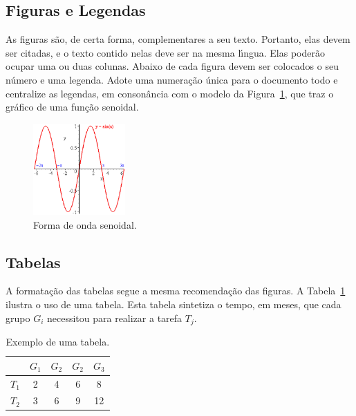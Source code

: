 \documentclass[11pt]{article}
\begin{document}
\subsection{Figuras e Legendas}
\label{sec:figuras}

As figuras s\~{a}o, de certa forma, complementares a seu texto.  Portanto,
elas devem ser citadas, e o texto contido nelas deve ser na mesma
l\'{\i}ngua. Elas poder\~{a}o ocupar uma ou duas colunas.  Abaixo de cada
figura devem ser colocados o seu n\'{u}mero e uma legenda.  Adote uma
numera\c{c}\~{a}o \'{u}nica para o documento todo e centralize as legendas, em
conson\^{a}ncia com o modelo da Figura~\ref{fig:forma_de_onda}, que traz o
gr\'{a}fico de uma fun\c{c}\~{a}o senoidal.

  \begin{figure}[H]
        {\centering
        \includegraphics[height=35mm]{sin.ps}
        \caption{Forma de onda senoidal.}
        \label{fig:forma_de_onda}\par}
  \end{figure}

\subsection{Tabelas}
\label{ssec:tabelas}

A formata\c{c}\~{a}o das tabelas segue a mesma recomenda\c{c}\~{a}o das figuras.
A Tabela~\ref{tab:ex} ilustra o uso de uma tabela. Esta tabela sintetiza
o tempo, em meses, que cada grupo $G_i$ necessitou para realizar a
tarefa $T_j$.

\begin{table}[H]
  {\centering
  \begin{tabular}{|c|c|c|c|c|}
  \hline
   & $G_1$ & $G_2$ & $G_2$ & $G_3$ \\
  \hline
  $T_1$ & 2 & 4 & 6 & 8 \\
  \hline
  $T_2$ & 3 & 6 & 9 & 12 \\
  \hline
  \end{tabular}
\caption{Exemplo de uma tabela.}
\label{tab:ex}
\par}
\end{table}
\end{document}
